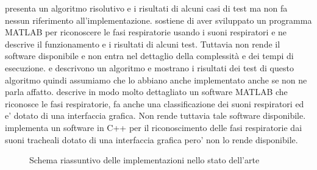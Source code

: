   \cite{RSDUVFD} presenta un algoritmo risolutivo e i risultati di alcuni casi di test ma non fa nessun riferimento all'implementazione.
  \cite{CARPDWAM} sostiene di aver sviluppato un programma MATLAB per riconoscere le fasi respiratorie usando i suoni respiratori e ne descrive il funzionamento e i risultati di alcuni test. Tuttavia non rende il software disponibile e non entra nel dettaglio della complessit\`a e dei tempi di esecuzione.
  \cite{ARSAPD} e \cite{ASPODUOCSS} descrivono un algoritmo e mostrano i risultati dei test di questo algoritmo quindi assumiamo che lo abbiano anche implementato anche se non ne parla affatto.
  \cite{ASTFARA} descrive in modo molto dettagliato un software MATLAB che riconosce le fasi respiratorie, fa anche una classificazione dei suoni respiratori ed e' dotato di una interfaccia grafica. Non rende tuttavia tale software disponibile.
  \cite{DECE} implementa un software in C++ per il riconoscimento delle fasi respiratorie dai suoni tracheali dotato di una interfaccia grafica pero' non lo rende disponibile.


\begin{center}
\begin{figure}

\centering
{}
\caption{Schema riassuntivo delle implementazioni nello stato dell'arte}
\label{schemariassuntivostatoarte}
\end{figure}
\end{center}




